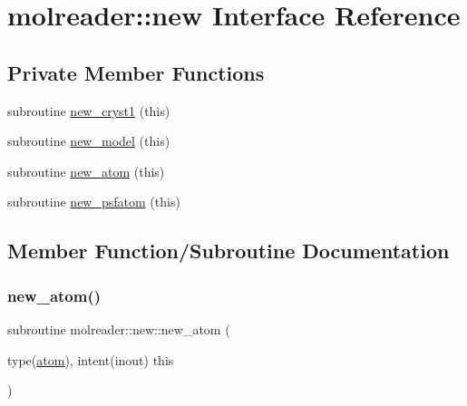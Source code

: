 \hypertarget{interfacemolreader_1_1new}{}\section{molreader\+:\+:new Interface Reference}
\label{interfacemolreader_1_1new}
\subsection*{Private Member Functions}
\begin{DoxyCompactItemize}
\item 
subroutine \hyperlink{interfacemolreader_1_1new_ad81ee1b9d12963227f168d144524de7c}{new\+\_\+cryst1} (this)
\item 
subroutine \hyperlink{interfacemolreader_1_1new_ac306717f3be718d382c6b9c38ade70bb}{new\+\_\+model} (this)
\item 
subroutine \hyperlink{interfacemolreader_1_1new_a45405dac2693a9b5fbe3f6a62707395b}{new\+\_\+atom} (this)
\item 
subroutine \hyperlink{interfacemolreader_1_1new_a61dff60bac414a094a6a1082f3a63296}{new\+\_\+psfatom} (this)
\end{DoxyCompactItemize}


\subsection{Member Function/\+Subroutine Documentation}
\mbox{\label{interfacemolreader_1_1new_a45405dac2693a9b5fbe3f6a62707395b}} 
\subsubsection{\texorpdfstring{new\+\_\+atom()}{new\_atom()}}
{\footnotesize\ttfamily subroutine molreader\+::new\+::new\+\_\+atom (\begin{DoxyParamCaption}\item[{type(\hyperlink{structmolreader_1_1atom}{atom}), intent(inout)}]{this }\end{DoxyParamCaption})\hspace{0.3cm}{\ttfamily [private]}}

\mbox{\label{interfacemolreader_1_1new_ad81ee1b9d12963227f168d144524de7c}} 
